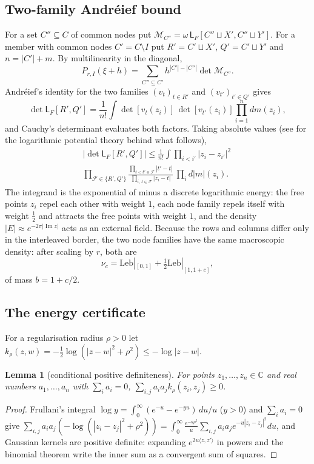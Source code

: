 \documentclass[11pt]{amsart}
\newtheorem{lemma}[theorem]{Lemma}
\theoremstyle{definition}
\theoremstyle{remark}
\numberwithin{equation}{section}
\newcommand{\C}{\mathbb C}
\renewcommand{\Im}{\operatorname{Im}}
\newcommand{\Lw}{\mathsf L}          %
\begin{document}
\subsection{Two-family Andr\'eief bound}
For a set $C''\subseteq C$ of common nodes put $\mathcal M_{C''}=\omega\,\Lw_F[C''\sqcup X',C''\sqcup Y']$. For a member with
common nodes $C'=C\setminus I$ put $R'=C'\sqcup X'$, $Q'=C'\sqcup Y'$ and $n=|C'|+m$. By multilinearity in the diagonal,
\begin{equation}\label{eq:expand}
 P_{r,I}(\xi+h)=\sum_{C''\subseteq C'}h^{|C'|-|C''|}\det\mathcal M_{C''} .
\end{equation}
Andr\'eief's identity \cite{Forrester2018Andreief} for the two families $(v_t)_{t\in R'}$ and $(v_{t'})_{t'\in Q'}$ gives
\[
 \det\Lw_F[R',Q']=\frac1{n!}\int\det[v_t(z_i)]\,\det[v_{t'}(z_i)]\prod_{i=1}^ndm(z_i),
\]
and Cauchy's determinant evaluates both factors. Taking absolute values (see \cite{SaffTotik} for the
logarithmic potential theory behind what follows),
\begin{multline*}
 |\det\Lw_F[R',Q']|\le\frac1{n!}\int\prod_{i<i'}|z_i-z_{i'}|^2\,\\
 \prod_{\mathcal F\in\{R',Q'\}}\frac{\prod_{t<t'\in\mathcal F}|t'-t|}{\prod_{i,\,t\in\mathcal F}|z_i-t|}\ \prod_id|m|(z_i).
\end{multline*}
The integrand is the exponential of minus a discrete logarithmic energy: the free points $z_i$ repel each other with
weight $1$, each node family repels itself with weight $\frac12$ and attracts the free points with weight $1$, and the
density $|E|\approx e^{-2\pi|\Im z|}$ acts as an external field. Because the rows and columns differ only in the
interleaved border, the two node families have the same macroscopic density: after scaling by $r$, both are
\[
 \nu_c=\mathrm{Leb}|_{[0,1]}+\tfrac12\mathrm{Leb}|_{[1,1+c]},
\]
of mass $b=1+c/2$.

\subsection{The energy certificate}
For a regularisation radius $\rho>0$ let $k_\rho(z,w)=-\frac12\log(|z-w|^2+\rho^2)\le-\log|z-w|$.

\begin{lemma}[conditional positive definiteness]\label{lem:cpd}
For points $z_1,\dots,z_n\in\C$ and real numbers $a_1,\dots,a_n$ with $\sum_ia_i=0$,
$\sum_{i,j}a_ia_jk_\rho(z_i,z_j)\ge0$.
\end{lemma}
\begin{proof}
Frullani's integral $\log y=\int_0^\infty(e^{-u}-e^{-yu})\,du/u$ ($y>0$) and $\sum_ia_i=0$ give
$\sum_{i,j}a_ia_j(-\log(|z_i-z_j|^2+\rho^2))=\int_0^\infty\frac{e^{-u\rho^2}}u\sum_{i,j}a_ia_je^{-u|z_i-z_j|^2}du$,
and Gaussian kernels are positive definite: expanding $e^{2u\langle z,z'\rangle}$ in powers and the binomial theorem
write the inner sum as a convergent sum of squares.
\end{proof}
\end{document}
